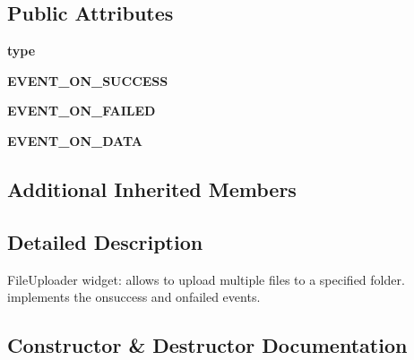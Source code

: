 \subsection*{Public Attributes}
\begin{DoxyCompactItemize}
\item 
{\bfseries type}\hypertarget{classremi_1_1gui_1_1FileUploader_ae7daaa670f80c08b326d3a95847b1bde}{}\label{classremi_1_1gui_1_1FileUploader_ae7daaa670f80c08b326d3a95847b1bde}

\item 
{\bfseries E\+V\+E\+N\+T\+\_\+\+O\+N\+\_\+\+S\+U\+C\+C\+E\+SS}\hypertarget{classremi_1_1gui_1_1FileUploader_acd673d8b6336fd75e0a03078b06a5106}{}\label{classremi_1_1gui_1_1FileUploader_acd673d8b6336fd75e0a03078b06a5106}

\item 
{\bfseries E\+V\+E\+N\+T\+\_\+\+O\+N\+\_\+\+F\+A\+I\+L\+ED}\hypertarget{classremi_1_1gui_1_1FileUploader_a4dbc1939726417fe5a958f3ee851cc5f}{}\label{classremi_1_1gui_1_1FileUploader_a4dbc1939726417fe5a958f3ee851cc5f}

\item 
{\bfseries E\+V\+E\+N\+T\+\_\+\+O\+N\+\_\+\+D\+A\+TA}\hypertarget{classremi_1_1gui_1_1FileUploader_a41e688e9604be2bea5b895473d3d664f}{}\label{classremi_1_1gui_1_1FileUploader_a41e688e9604be2bea5b895473d3d664f}

\end{DoxyCompactItemize}
\subsection*{Additional Inherited Members}


\subsection{Detailed Description}
\begin{DoxyVerb}FileUploader widget:
    allows to upload multiple files to a specified folder.
    implements the onsuccess and onfailed events.
\end{DoxyVerb}
 

\subsection{Constructor \& Destructor Documentation}
